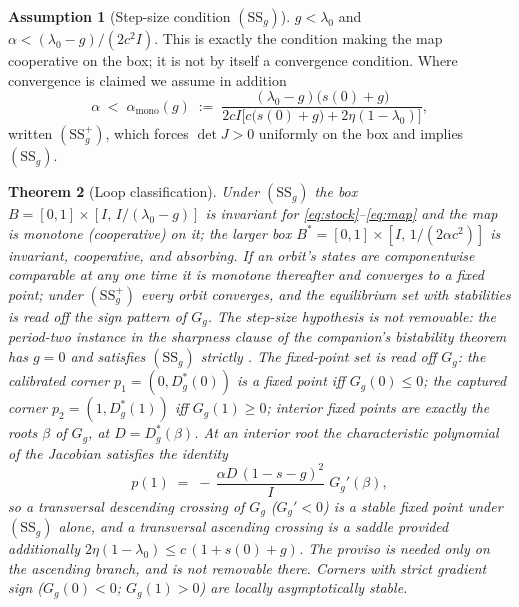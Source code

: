 \documentclass[11pt]{article}
\newtheorem{theorem}{Theorem}[section]
\theoremstyle{definition}
\newtheorem{assumption}[theorem]{Assumption}
\theoremstyle{remark}
\numberwithin{equation}{section}
\begin{document}
\begin{assumption}[Step-size condition $(\mathrm{SS}_g)$]\label{ass:ss}
$g<\lambda_0$ and $\alpha < (\lambda_0-g)/(2c^2 I)$. This is exactly the condition making the map cooperative on the box; it is not by itself a convergence condition. Where convergence is claimed we assume in addition
\begin{equation}\label{eq:ssplusg}
\alpha \;<\; \alpha_{\mathrm{mono}}(g) \;:=\; \frac{(\lambda_0-g)\bigl(s(0)+g\bigr)}{2cI\bigl[c\bigl(s(0)+g\bigr) + 2\eta(1-\lambda_0)\bigr]},
\end{equation}
written $(\mathrm{SS}^+_g)$, which forces $\det J>0$ uniformly on the box and implies $(\mathrm{SS}_g)$.
\end{assumption}

\begin{theorem}[Loop classification]\label{thm:classify}
Under $(\mathrm{SS}_g)$ the box $B=[0,1]\times[I,\,I/(\lambda_0-g)]$ is invariant for \eqref{eq:stock}--\eqref{eq:map} and the map is monotone (cooperative) on it; the larger box $B^\ast=[0,1]\times[I,\,1/(2\alpha c^2)]$ is invariant, cooperative, and absorbing. If an orbit's states are componentwise comparable at any one time it is monotone thereafter and converges to a fixed point; under $(\mathrm{SS}^+_g)$ every orbit converges, and the equilibrium set with stabilities is read off the sign pattern of $G_g$. The step-size hypothesis is not removable: the period-two instance in the sharpness clause of the companion's bistability theorem has $g=0$ and satisfies $(\mathrm{SS}_g)$ strictly \citep{hofheinz2026drift}. The fixed-point set is read off $G_g$: the calibrated corner $p_1=(0,D^\ast_g(0))$ is a fixed point iff $G_g(0)\le 0$; the captured corner $p_2=(1,D^\ast_g(1))$ iff $G_g(1)\ge 0$; interior fixed points are exactly the roots $\beta$ of $G_g$, at $D=D^\ast_g(\beta)$. At an interior root the characteristic polynomial of the Jacobian satisfies the identity
\begin{equation}\label{eq:p1}
p(1) \;=\; -\,\frac{\alpha D\,(1-s-g)^2}{I}\;G_g'(\beta),
\end{equation}
so a transversal descending crossing of $G_g$ ($G_g'<0$) is a stable fixed point under $(\mathrm{SS}_g)$ alone, and a transversal ascending crossing is a saddle provided additionally $2\eta(1-\lambda_0)\le c\,(1+s(0)+g)$. The proviso is needed only on the ascending branch, and is not removable there. Corners with strict gradient sign ($G_g(0)<0$; $G_g(1)>0$) are locally asymptotically stable.
\end{theorem}
\end{document}
